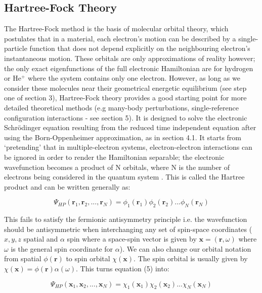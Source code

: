 \documentclass[10pt]{article}
\begin{document}
\subsection{Hartree-Fock Theory}
The Hartree-Fock method is the basis of molecular orbital theory, which postulates that in a material, each electron's motion can be described by a single-particle function that does not depend explicitly on the neighbouring electron's instantaneous motion. These orbitals are only approximations of reality however; the only exact eigenfunctions of the full electronic Hamiltonian are for hydrogen or He$^+$ where the system contains only one electron. However, as long as we consider these molecules near their geometrical energetic equilibrium (see step one of section 3), Hartree-Fock theory provides a good starting point for more detailed theoretical methods (e.g many-body perturbations, single-reference configuration interactions - see section 5). It is designed to solve the electronic Schrödinger equation resulting from the reduced time independent equation after using the Born-Oppenheimer approximation, as in section 4.1. It starts from `pretending' that in multiple-electron systems, electron-electron interactions can be ignored in order to render the Hamiltonian separable; the electronic wavefunction becomes a product of N orbitals, where N is the number of electrons being considered in the quantum system \cite{sherrill2000introduction}. This is called the Hartree product and can be written generally as:

\begin{equation}
	\Psi_{HP}(\mathbf{r}_1,\mathbf{r}_2,...,\mathbf{r}_N) = \phi_1(\mathbf{r}_1)\phi_2(\mathbf{r}_2)...\phi_N(\mathbf{r}_N)
\end{equation}

This fails to satisfy the fermionic antisymmetry principle i.e. the wavefunction should be antisymmetric when interchanging any set of spin-space coordinates ($x,y,z$ spatial and $\alpha$ spin where a space-spin vector is given by $\mathbf{x}=(\mathbf{r},\omega)$ where $\omega$ is the general spin coordinate for $\alpha$). We can also change our orbital notation from spatial $\phi(\mathbf{r})$ to spin orbital $\chi(\mathbf{x})$. The spin orbital is usually given by $\chi(\mathbf{x}) = \phi(\mathbf{r})\alpha(\omega)$. This turns equation (5) into:

\begin{equation*}
	\Psi_{HP}(\mathbf{x}_1,\mathbf{x}_2,...,\mathbf{x}_N) = \chi_1(\mathbf{x}_1)\chi_2(\mathbf{x}_2)...\chi_N(\mathbf{x}_N)
\end{equation*}
\end{document}
